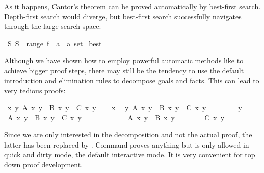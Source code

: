 \begin{isabellebody}
\begin{isamarkuptext}
As it happens, Cantor's theorem can be proved automatically by best-first
search. Depth-first search would diverge, but best-first search successfully
navigates through the large search space:%
\end{isamarkuptext}%
\isamarkuptrue%
\isamarkupfalse%
\ {\isachardoublequoteopen}{\isasymexists}S{\isachardot}\ S\ {\isasymnotin}\ range\ {\isacharparenleft}f\ {\isacharcolon}{\isacharcolon}\ {\isacharprime}a\ {\isasymRightarrow}\ {\isacharprime}a\ set{\isacharparenright}{\isachardoublequoteclose}\isanewline
%
\isadelimproof
%
\endisadelimproof
%
\isatagproof
{}\isamarkupfalse%
\ best%
\endisatagproof
{\isafoldproof}%
%
\isadelimproof
%
\endisadelimproof
%
\isamarkuptrue%
%
\begin{isamarkuptext}%
Although we have shown how to employ powerful automatic methods like
 to achieve bigger proof steps, there may still be the
tendency to use the default introduction and elimination rules to
decompose goals and facts. This can lead to very tedious proofs:%
\end{isamarkuptext}%
\isamarkuptrue%
%
\isadelimML
%
\endisadelimML
%
\isatagML
%
\endisatagML
{\isafoldML}%
%
\isadelimML
%
\endisadelimML
{}\isamarkupfalse%
\ {\isachardoublequoteopen}{\isasymforall}x\ y{\isachardot}\ A\ x\ y\ {\isasymand}\ B\ x\ y\ {\isasymlongrightarrow}\ C\ x\ y{\isachardoublequoteclose}\isanewline
%
\isadelimproof
%
\endisadelimproof
%
\isatagproof
{}\isamarkupfalse%
\isanewline
\ \ \isamarkupfalse%
\ x\ \isamarkupfalse%
\ {\isachardoublequoteopen}{\isasymforall}y{\isachardot}\ A\ x\ y\ {\isasymand}\ B\ x\ y\ {\isasymlongrightarrow}\ C\ x\ y{\isachardoublequoteclose}\isanewline
\ \ \isamarkupfalse%
\isanewline
\ \ \ \ \isamarkupfalse%
\ y\ \isamarkupfalse%
\ {\isachardoublequoteopen}A\ x\ y\ {\isasymand}\ B\ x\ y\ {\isasymlongrightarrow}\ C\ x\ y{\isachardoublequoteclose}\isanewline
\ \ \ \ \isamarkupfalse%
\isanewline
\ \ \ \ \ \ \isamarkupfalse%
\ {\isachardoublequoteopen}A\ x\ y\ {\isasymand}\ B\ x\ y{\isachardoublequoteclose}\isanewline
\ \ \ \ \ \ \isamarkupfalse%
\ {\isachardoublequoteopen}C\ x\ y{\isachardoublequoteclose}\ \isamarkupfalse%
\isanewline
\ \ \ \ \isamarkupfalse%
\isanewline
\ \ \isamarkupfalse%
\isanewline
{}\isamarkupfalse%
%
\endisatagproof
{\isafoldproof}%
%
\isadelimproof
%
\endisadelimproof
%
\begin{isamarkuptext}%
\noindent Since we are only interested in the decomposition and not the
actual proof, the latter has been replaced by
. Command  proves anything but is
only allowed in quick and dirty mode, the default interactive mode. It
is very convenient for top down proof development.


\end{isamarkuptext}
\end{isabellebody}
